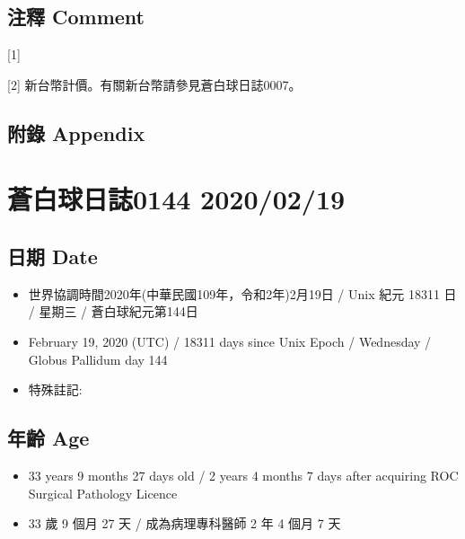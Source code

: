 \documentclass[
]{article}
\providecommand{\tightlist}{%
  \setlength{\itemsep}{0pt}\setlength{\parskip}{0pt}}
\begin{document}
\hypertarget{ux6ce8ux91cb-comment-17}{%
\subsection{注釋 Comment}\label{ux6ce8ux91cb-comment-17}}

{[}1{]}

{[}2{]} 新台幣計價。有關新台幣請參見蒼白球日誌0007。

\hypertarget{ux9644ux9304-appendix-17}{%
\subsection{附錄 Appendix}\label{ux9644ux9304-appendix-17}}

\hypertarget{ux84bcux767dux7403ux65e5ux8a8c0144-20200219}{%
\section{蒼白球日誌0144
2020/02/19}\label{ux84bcux767dux7403ux65e5ux8a8c0144-20200219}}

\hypertarget{ux65e5ux671f-date-18}{%
\subsection{日期 Date}\label{ux65e5ux671f-date-18}}

\begin{itemize}
\tightlist
\item
  世界協調時間2020年(中華民國109年，令和2年)2月19日 / Unix 紀元 18311 日
  / 星期三 / 蒼白球紀元第144日
\item
  February 19, 2020 (UTC) / 18311 days since Unix Epoch / Wednesday /
  Globus Pallidum day 144
\item
  特殊註記:
\end{itemize}

\hypertarget{ux5e74ux9f61-age-18}{%
\subsection{年齡 Age}\label{ux5e74ux9f61-age-18}}

\begin{itemize}
\tightlist
\item
  33 years 9 months 27 days old / 2 years 4 months 7 days after
  acquiring ROC Surgical Pathology Licence
\item
  33 歲 9 個月 27 天 / 成為病理專科醫師 2 年 4 個月 7 天
\end{itemize}
\end{document}
